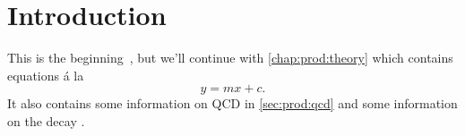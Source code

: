 \chapter{Introduction}
\label{chap:prod:introduction}

This is the beginning~\cite{PDG2014}, but we'll continue with 
\cref{chap:prod:theory} which contains equations \'a la
\begin{equation}
  y = mx + c.
  \label{eqn:foo}
\end{equation}
It also contains some information on \ac{QCD} in \cref{sec:prod:qcd} and some 
information on the decay \decay{\PLambdac}{\Pproton\PKp\PKm}.

\lipsum[1-2]
